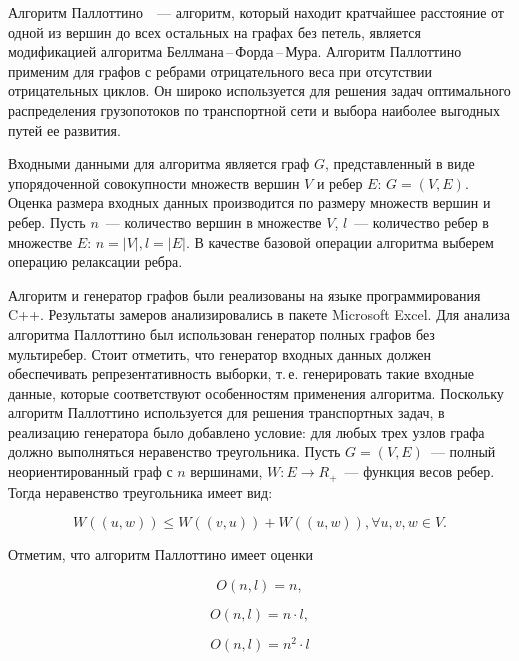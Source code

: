 \documentclass[a4paper, article, 12pt]{extarticle}
\begin{document}
Алгоритм Паллоттино~\cite{pallottino}~--- алгоритм, который находит кратчайшее расстояние от одной из вершин до всех остальных на графах без петель, является модификацией алгоритма Беллмана\,--\,Форда\,--\,Мура. Алгоритм Паллоттино применим для графов с ребрами отрицательного веса при отсутствии отрицательных циклов. Он широко используется для решения задач оптимального распределения грузопотоков по транспортной сети и выбора наиболее выгодных путей ее развития.

Входными данными для алгоритма является граф $G$, представленный в виде упорядоченной совокупности множеств вершин $V$ и ребер $E$: $G = (V, E)$. Оценка размера входных данных производится по размеру множеств вершин и ребер. Пусть $n$~--- количество вершин в множестве $V$, $l$~--- количество ребер в множестве $E$: $n = |V|, l = |E|$. В качестве базовой операции алгоритма выберем операцию релаксации ребра.

Алгоритм и генератор графов были реализованы на языке программирования C++. Результаты замеров анализировались в пакете Microsoft Excel. Для анализа алгоритма Паллоттино был использован генератор полных графов без мультиребер. Стоит отметить, что генератор входных данных должен обеспечивать репрезентативность выборки, т.\,е. генерировать такие входные данные, которые соответствуют особенностям применения алгоритма. Поскольку алгоритм Паллоттино используется для решения транспортных задач, в реализацию генератора было добавлено условие: для любых трех узлов графа должно выполняться неравенство треугольника. Пусть $G = (V, E)$~--- полный неориентированный граф с $n$ вершинами, $W: E \rightarrow R_+$~--- функция весов ребер. Тогда неравенство треугольника имеет вид:

\begin{equation}\label{eq:triangle_inequality}
	W((u, w)) \leq W((v, u)) + W((u, w)), \forall u, v, w \in V.
\end{equation}

Отметим, что алгоритм Паллоттино имеет оценки

\begin{equation}\label{eq:pallottino_best}
	O(n, l) = n,
\end{equation}

\begin{equation}\label{eq:pallottino_average}
	O(n, l) = n \cdot l,
\end{equation}

\begin{equation}\label{eq:pallottino_worst}
	O(n, l) = n^2 \cdot l
\end{equation}
\end{document}
